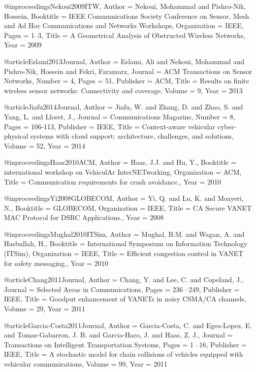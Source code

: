 {{{{{{{{@inproceedings{Nekoui2009ITW,
	Author = {Nekoui, Mohammad and Pishro-Nik, Hossein},
	Booktitle = {IEEE Communications Society Conference on Sensor, Mesh and Ad Hoc Communications and Networks Workshops},
	Organization = {IEEE},
	Pages = {1--3},
	Title = {A Geometrical Analysis of Obstructed Wireless Networks},
	Year = {2009}}

@article{Eslami2013Journal,
	Author = {Eslami, Ali and Nekoui, Mohammad and Pishro-Nik, Hossein and Fekri, Faramarz},
	Journal = {ACM Transactions on Sensor Networks},
	Number = {4},
	Pages = {51},
	Publisher = {ACM},
	Title = {Results on finite wireless sensor networks: Connectivity and coverage},
	Volume = {9},
	Year = {2013}}


@article{Jiafu2014Journal,
	Author = {Jiafu, W. and Zhang, D. and Zhao, S. and Yang, L. and Lloret, J.},
	Journal = {Communications Magazine},
	Number = {8},
	Pages = {106-113},
	Publisher = {IEEE},
	Title = {Context-aware vehicular cyber-physical systems with cloud support: architecture, challenges, and solutions},
	Volume = {52},
	Year = {2014}}

@inproceedings{Haas2010ACM,
	Author = {Haas, J.J. and Hu, Y.},
	Booktitle = {international workshop on VehiculAr InterNETworking},
	Organization = {ACM},
	Title = {Communication requirements for crash avoidance.},
	Year = {2010}}

@inproceedings{Yi2008GLOBECOM,
	Author = {Yi, Q. and Lu, K. and Moayeri, N.},
	Booktitle = {GLOBECOM},
	Organization = {IEEE},
	Title = {CA Secure VANET MAC Protocol for DSRC Applications.},
	Year = {2008}}

@inproceedings{Mughal2010ITSim,
	Author = {Mughal, B.M. and Wagan, A. and Hasbullah, H.},
	Booktitle = {International Symposium on Information Technology (ITSim)},
	Organization = {IEEE},
	Title = {Efficient congestion control in VANET for safety messaging.},
	Year = {2010}}

@article{Chang2011Journal,
	Author = {Chang, Y. and Lee, C. and Copeland, J.},
	Journal = {Selected Areas in Communications},
	Pages = {236 –249},
	Publisher = {IEEE},
	Title = {Goodput enhancement of VANETs in noisy CSMA/CA channels},
	Volume = {29},
	Year = {2011}}

@article{Garcia-Costa2011Journal,
	Author = {Garcia-Costa, C. and Egea-Lopez, E. and Tomas-Gabarron, J. B. and Garcia-Haro, J. and Haas, Z. J.},
	Journal = {Transactions on Intelligent Transportation Systems},
	Pages = {1 –16},
	Publisher = {IEEE},
	Title = {A stochastic model for chain collisions of vehicles equipped with vehicular communications},
	Volume = {99},
	Year = {2011}}

}}}}}}}}
